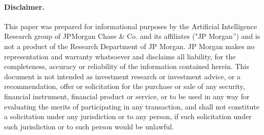 \paragraph{Disclaimer.}
This paper was prepared for informational purposes by the Artificial Intelligence Research group of JPMorgan Chase \& Co. and its affiliates ("JP Morgan'') and is not a product of the Research Department of JP Morgan. JP Morgan makes no representation and warranty whatsoever and disclaims all liability, for the completeness, accuracy or reliability of the information contained herein. This document is not intended as investment research or investment advice, or a recommendation, offer or solicitation for the purchase or sale of any security, financial instrument, financial product or service, or to be used in any way for evaluating the merits of participating in any transaction, and shall not constitute a solicitation under any jurisdiction or to any person, if such solicitation under such jurisdiction or to such person would be unlawful.